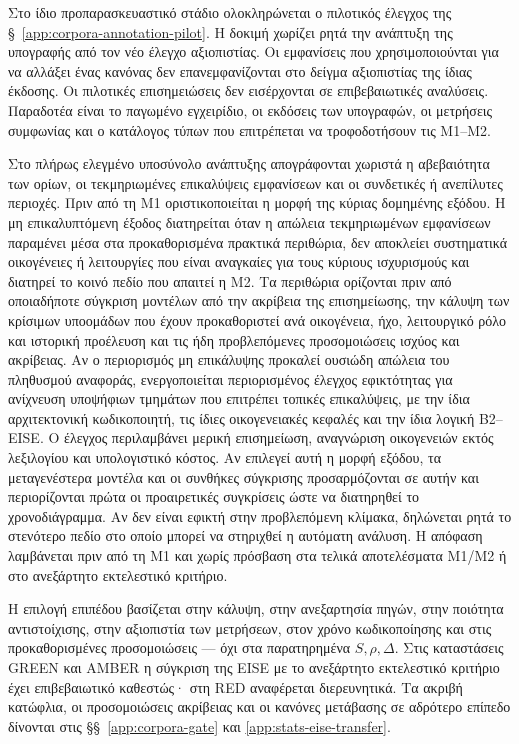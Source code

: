 \documentclass[11pt,a4paper]{article}
\begin{document}
Στο ίδιο προπαρασκευαστικό στάδιο ολοκληρώνεται ο πιλοτικός έλεγχος της §~\ref{app:corpora-annotation-pilot}. Η δοκιμή χωρίζει ρητά την ανάπτυξη της υπογραφής από τον νέο έλεγχο αξιοπιστίας. Οι εμφανίσεις που χρησιμοποιούνται για να αλλάξει ένας κανόνας δεν επανεμφανίζονται στο δείγμα αξιοπιστίας της ίδιας έκδοσης. Οι πιλοτικές επισημειώσεις δεν εισέρχονται σε επιβεβαιωτικές αναλύσεις. Παραδοτέα είναι το παγωμένο εγχειρίδιο, οι εκδόσεις των υπογραφών, οι μετρήσεις συμφωνίας και ο κατάλογος τύπων που επιτρέπεται να τροφοδοτήσουν τις M1--M2.

Στο πλήρως ελεγμένο υποσύνολο ανάπτυξης απογράφονται χωριστά η αβεβαιότητα των ορίων, οι τεκμηριωμένες επικαλύψεις εμφανίσεων και οι συνδετικές ή ανεπίλυτες περιοχές. Πριν από τη M1 οριστικοποιείται η μορφή της κύριας δομημένης εξόδου. Η μη επικαλυπτόμενη έξοδος διατηρείται όταν η απώλεια τεκμηριωμένων εμφανίσεων παραμένει μέσα στα προκαθορισμένα πρακτικά περιθώρια, δεν αποκλείει συστηματικά οικογένειες ή λειτουργίες που είναι αναγκαίες για τους κύριους ισχυρισμούς και διατηρεί το κοινό πεδίο που απαιτεί η M2. Τα περιθώρια ορίζονται πριν από οποιαδήποτε σύγκριση μοντέλων από την ακρίβεια της επισημείωσης, την κάλυψη των κρίσιμων υποομάδων που έχουν προκαθοριστεί ανά οικογένεια, ήχο, λειτουργικό ρόλο και ιστορική προέλευση και τις ήδη προβλεπόμενες προσομοιώσεις ισχύος και ακρίβειας. Αν ο περιορισμός μη επικάλυψης προκαλεί ουσιώδη απώλεια του πληθυσμού αναφοράς, ενεργοποιείται περιορισμένος έλεγχος εφικτότητας για ανίχνευση υποψήφιων τμημάτων που επιτρέπει τοπικές επικαλύψεις, με την ίδια αρχιτεκτονική κωδικοποιητή, τις ίδιες οικογενειακές κεφαλές και την ίδια λογική B2--EISE. Ο έλεγχος περιλαμβάνει μερική επισημείωση, αναγνώριση οικογενειών εκτός λεξιλογίου και υπολογιστικό κόστος. Αν επιλεγεί αυτή η μορφή εξόδου, τα μεταγενέστερα μοντέλα και οι συνθήκες σύγκρισης προσαρμόζονται σε αυτήν και περιορίζονται πρώτα οι προαιρετικές συγκρίσεις ώστε να διατηρηθεί το χρονοδιάγραμμα. Αν δεν είναι εφικτή στην προβλεπόμενη κλίμακα, δηλώνεται ρητά το στενότερο πεδίο στο οποίο μπορεί να στηριχθεί η αυτόματη ανάλυση. Η απόφαση λαμβάνεται πριν από τη M1 και χωρίς πρόσβαση στα τελικά αποτελέσματα M1/M2 ή στο ανεξάρτητο εκτελεστικό κριτήριο.

Η επιλογή επιπέδου βασίζεται στην κάλυψη, στην ανεξαρτησία πηγών, στην ποιότητα αντιστοίχισης, στην αξιοπιστία των μετρήσεων, στον χρόνο κωδικοποίησης και στις προκαθορισμένες προσομοιώσεις --- όχι στα παρατηρημένα \(S,\rho,\Delta\). Στις καταστάσεις GREEN και AMBER η σύγκριση της EISE με το ανεξάρτητο εκτελεστικό κριτήριο έχει επιβεβαιωτικό καθεστώς· στη RED αναφέρεται διερευνητικά. Τα ακριβή κατώφλια, οι προσομοιώσεις ακρίβειας και οι κανόνες μετάβασης σε αδρότερο επίπεδο δίνονται στις §§~\ref{app:corpora-gate} και \ref{app:stats-eise-transfer}.
\end{document}
